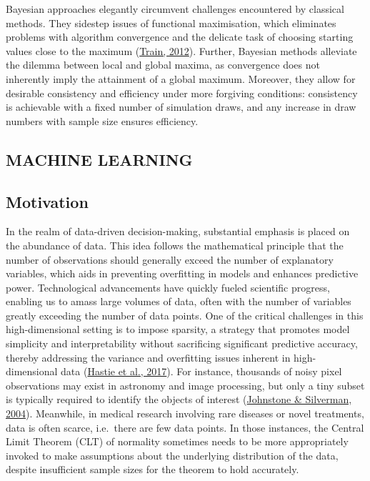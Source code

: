 \documentclass[
  11pt,
]{article}
\begin{document}
Bayesian approaches elegantly circumvent challenges encountered by
classical methods. They sidestep issues of functional maximisation,
which eliminates problems with algorithm convergence and the delicate
task of choosing starting values close to the maximum
(\protect\hyperlink{ref-Train2012}{Train, 2012}). Further, Bayesian
methods alleviate the dilemma between local and global maxima, as
convergence does not inherently imply the attainment of a global
maximum. Moreover, they allow for desirable consistency and efficiency
under more forgiving conditions: consistency is achievable with a fixed
number of simulation draws, and any increase in draw numbers with sample
size ensures efficiency.

\hypertarget{machine-learning}{%
\subsection{MACHINE LEARNING}\label{machine-learning}}

\subsection{Motivation}

In the realm of data-driven decision-making, substantial emphasis is
placed on the abundance of data. This idea follows the mathematical
principle that the number of observations should generally exceed the
number of explanatory variables, which aids in preventing overfitting in
models and enhances predictive power. Technological advancements have
quickly fueled scientific progress, enabling us to amass large volumes
of data, often with the number of variables greatly exceeding the number
of data points. One of the critical challenges in this high-dimensional
setting is to impose sparsity, a strategy that promotes model simplicity
and interpretability without sacrificing significant predictive
accuracy, thereby addressing the variance and overfitting issues
inherent in high-dimensional data
(\protect\hyperlink{ref-Hastie2017}{Hastie et al., 2017}). For instance,
thousands of noisy pixel observations may exist in astronomy and image
processing, but only a tiny subset is typically required to identify the
objects of interest (\protect\hyperlink{ref-Johnstone2004}{Johnstone \&
Silverman, 2004}). Meanwhile, in medical research involving rare
diseases or novel treatments, data is often scarce, i.e.~there are few
data points. In those instances, the Central Limit Theorem (CLT) of
normality sometimes needs to be more appropriately invoked to make
assumptions about the underlying distribution of the data, despite
insufficient sample sizes for the theorem to hold accurately.
\end{document}
